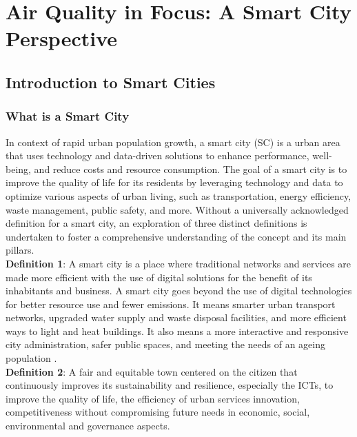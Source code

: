\chapter{Air Quality in Focus: A Smart City Perspective}
\label{chap:OpenDatainSmartCities}

\section{Introduction to Smart Cities}
\label{sec:IntroductionSmartCities}

\subsection{What is a Smart City}

In context of rapid urban population growth, a smart city (SC) is a urban area that uses technology and data-driven solutions to enhance performance, well-being, and reduce costs and resource consumption. The goal of a smart city is to improve the quality of life for its residents by leveraging technology and data to optimize various aspects of urban living, such as transportation, energy efficiency, waste management, public safety, and more. 
Without a universally acknowledged definition for a smart city, an exploration of three distinct definitions is undertaken to foster a comprehensive understanding of the concept and its main pillars.
\\

\textbf{Definition 1}: A smart city is a place where traditional networks and services are made more efficient with the use of digital solutions for the benefit of its inhabitants and business. A smart city goes beyond the use of digital technologies for better resource use and fewer emissions. It means smarter urban transport networks, upgraded water supply and waste disposal facilities, and more efficient ways to light and heat buildings. It also means a more interactive and responsive city administration, safer public spaces, and meeting the needs of an ageing population \cite{foo1}.
\\

\textbf{Definition 2}: A fair and equitable town centered on the citizen that continuously improves its sustainability and resilience, especially the ICTs, to improve the quality of life, the efficiency of urban services innovation, competitiveness without compromising future needs in economic, social, environmental and governance aspects.
\\

